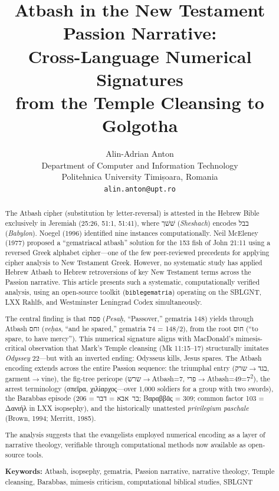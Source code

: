 \documentclass[12pt,a4paper]{article}
\title{\textbf{Atbash in the New Testament Passion Narrative:\\Cross-Language Numerical Signatures\\from the Temple Cleansing to Golgotha}}
\author{Alin-Adrian Anton\\
\small Department of Computer and Information Technology\\
\small Politehnica University Timișoara, Romania\\
\small \texttt{alin.anton@upt.ro}}
\date{}
\begin{document}
\maketitle

\begin{abstract}
The Atbash cipher (substitution by letter-reversal) is attested in the Hebrew Bible exclusively in Jeremiah (25:26, 51:1, 51:41), where שׁשׁך (\textit{Sheshach}) encodes בבל (\textit{Babylon}). Noegel (1996) identified nine instances computationally. Neil McEleney (1977) proposed a ``gematriacal atbash'' solution for the 153 fish of John 21:11 using a reversed Greek alphabet cipher---one of the few peer-reviewed precedents for applying cipher analysis to New Testament Greek. However, no systematic study has applied Hebrew Atbash to Hebrew retroversions of key New Testament terms across the Passion narrative. This article presents such a systematic, computationally verified analysis, using an open-source toolkit (\texttt{biblegematria}) operating on the SBLGNT, LXX Rahlfs, and Westminster Leningrad Codex simultaneously.

The central finding is that פסח (\textit{Pesaḥ}, ``Passover,'' gematria 148) yields through Atbash וחס (\textit{veḥas}, ``and he spared,'' gematria 74 = 148/2), from the root חוס (``to spare, to have mercy''). This numerical signature aligns with MacDonald's mimesis-critical observation that Mark's Temple cleansing (Mk 11:15--17) structurally imitates \textit{Odyssey} 22---but with an inverted ending: Odysseus kills, Jesus spares. The Atbash encoding extends across the entire Passion sequence: the triumphal entry (בגד$\to$שרק, garment$\to$vine), the fig-tree pericope (שרש$\to$Atbash=7, פרי$\to$Atbash=49=7\textsuperscript{2}), the arrest terminology (σπεῖρα, χιλίαρχος---over 1,000 soldiers for a group with two swords), the Barabbas episode (בר~אבא = דבר = 206; Βαραββᾶς = 309; common factor 103 = Δανιήλ in LXX isopsephy), and the historically unattested \textit{privilegium paschale} (Brown, 1994; Merritt, 1985).

The analysis suggests that the evangelists employed numerical encoding as a layer of narrative theology, verifiable through computational methods now available as open-source tools.

\medskip\noindent
\textbf{Keywords:} Atbash, isopsephy, gematria, Passion narrative, narrative theology, Temple cleansing, Barabbas, mimesis criticism, computational biblical studies, SBLGNT
\end{abstract}
\end{document}
